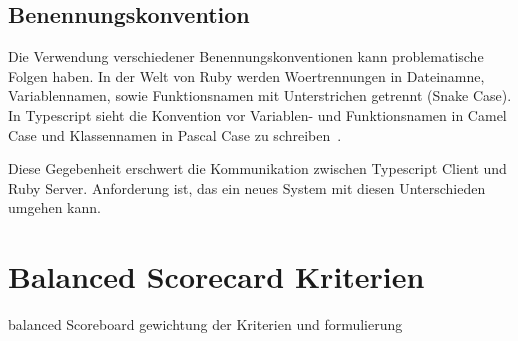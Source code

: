 \subsection{Benennungskonvention}
Die Verwendung verschiedener Benennungskonventionen kann problematische Folgen haben.
In der Welt von Ruby werden Woertrennungen in Dateinamne, Variablennamen, sowie Funktionsnamen mit Unterstrichen getrennt (Snake Case).
In Typescript sieht die Konvention vor Variablen- und Funktionsnamen in Camel Case und Klassennamen in Pascal Case zu schreiben~\cite{typescript-conventions}.

Diese Gegebenheit erschwert die Kommunikation zwischen Typescript Client und Ruby Server. Anforderung ist, das ein neues System mit diesen Unterschieden umgehen kann.

\section{Balanced Scorecard Kriterien}
balanced Scoreboard gewichtung der Kriterien und formulierung
